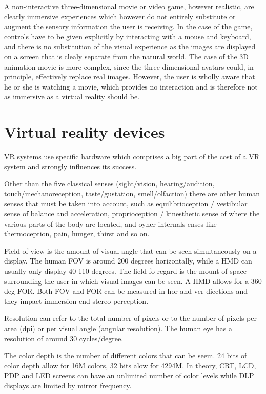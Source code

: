 \documentclass[a4paper]{article}
\begin{document}
A non-interactive three-dimensional movie or video game, however
realistic, are clearly immersive experiences which however do not
entirely substitute or augment the sensory information the user is
receiving. In the case of the game, controls have to be given explicitly
by interacting with a mouse and keyboard, and there is no substitution
of the visual experience as the images are displayed on a screen that is
clealy separate from the natural world. The case of the 3D animation
movie is more complex, since the three-dimensional avatars could, in
principle, effectively replace real images. However, the user is wholly
aware that he or she is watching a movie, which provides no interaction
and is therefore not as immersive as a virtual reality should be.


\section{Virtual reality devices}

VR systems use specific hardware which comprises a big part of the cost
of a VR system and strongly influences its success.

Other than the five classical senses (sight/vision, hearing/audition,
touch/mechanoreception, taste/gustation, smell/olfaction) there are
other human senses that must be taken into account, such as
equilibrioception / vestibular sense of balance and acceleration,
proprioception / kinesthetic sense of where the various parts of the
body are located, and oyher internals enses like thermoception, pain,
hunger, thirst and so on.

Field of view is the amount of visual angle that can be seen
simultaneously on a display. The human FOV is around 200 degrees
horizontally, while a HMD can usually only display 40-110 degrees. The
field fo regard is the mount of space surrounding the user in which
visual images can be seen. A HMD allows for a 360 deg FOR. Both FOV and
FOR can be measured in hor and ver diections and they impact immersion
end stereo perception.

Resolution can refer to the total number of pixels or to the number of
pixels per area (dpi) or per visual angle (angular resolution). The
human eye has a resolution of around 30 cycles/degree.

The color depth is the number of different colors that can be seem. 24
bits of color depth allow for 16M colors, 32 bits alow for 4294M. In
theory, CRT, LCD, PDP and LED screens can have an unlimited number of
color levels while DLP displays are limited by mirror frequency.
\end{document}
